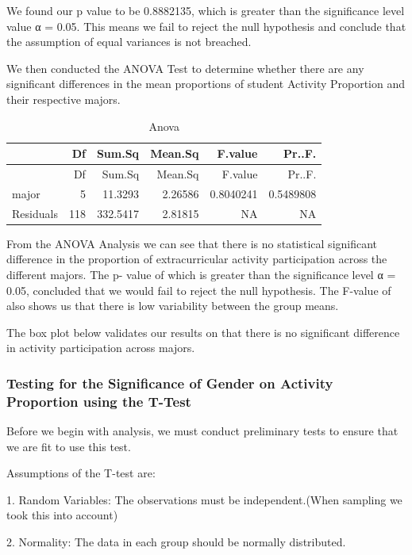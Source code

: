\documentclass[
  letterpaper,
  DIV=11,
  numbers=noendperiod]{scrartcl}
\begin{document}
We found our p value to be 0.8882135, which is greater than the
significance level value α = 0.05. This means we fail to reject the null
hypothesis and conclude that the assumption of equal variances is not
breached.

We then conducted the ANOVA Test to determine whether there are any
significant differences in the mean proportions of student Activity
Proportion and their respective majors.

\begin{longtable}[]{@{}lrrrrr@{}}
\caption{Anova}\tabularnewline
\toprule\noalign{}
& Df & Sum.Sq & Mean.Sq & F.value & Pr..F. \\
\midrule\noalign{}
\endfirsthead
\toprule\noalign{}
& Df & Sum.Sq & Mean.Sq & F.value & Pr..F. \\
\midrule\noalign{}
\endhead
\bottomrule\noalign{}
\endlastfoot
major & 5 & 11.3293 & 2.26586 & 0.8040241 & 0.5489808 \\
Residuals & 118 & 332.5417 & 2.81815 & NA & NA \\
\end{longtable}

From the ANOVA Analysis we can see that there is no statistical
significant difference in the proportion of extracurricular activity
participation across the different majors. The p- value of which is
greater than the significance level α = 0.05, concluded that we would
fail to reject the null hypothesis. The F-value of also shows us that
there is low variability between the group means.

The box plot below validates our results on that there is no significant
difference in activity participation across majors.

\subsubsection{Testing for the Significance of Gender on Activity
Proportion using the
T-Test}\label{testing-for-the-significance-of-gender-on-activity-proportion-using-the-t-test}

Before we begin with analysis, we must conduct preliminary tests to
ensure that we are fit to use this test.

Assumptions of the T-test are:

1. Random Variables: The observations must be independent.(When sampling
we took this into account)

2. Normality: The data in each group should be normally distributed.
\end{document}
